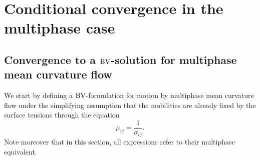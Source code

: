 \section{Conditional convergence in the multiphase case}

\subsection{Convergence to a $\operatorname{BV}$-solution for multiphase mean curvature flow}

We start by defining a $ \operatorname{BV} $-formulation for motion by multiphase mean 
curvature flow under the simplifying assumption that the mobilities are already 
fixed by the surface tensions through the equation
\begin{equation}
	\label{mobilites_inverse_of_surface_tensions}
	\mu_{ i j } =\frac{ 1 }{ \sigma_{ i j } }. 
\end{equation}
Note moreover that in this section, all expressions refer to their multiphase 
equivalent.

